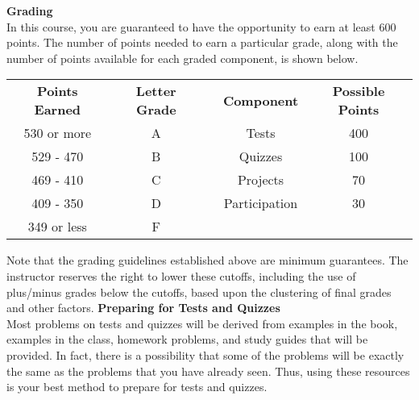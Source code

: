 \documentclass[addpoints,12pt]{exam}
\begin{document}
\wl
\noindent \textbf{Grading} \\
In this course, you are guaranteed to have the opportunity to earn at least 600 points. The number of points needed to earn a particular grade, along with the number of points available for each graded component, is shown below.

\begin{table}[h] \sffamily \centering
\begin{tabular}{|c|c|lcc}
\cline{1-2} \cline{4-5} 
\textbf{Points Earned} & \textbf{Letter Grade} &             \multicolumn{1}{l|}{}            & \multicolumn{1}{c|}{\textbf{Component}}                    &    \multicolumn{1}{c|}{\textbf{Possible Points}}                                           \\ \cline{1-2} \cline{4-5} 
530 or more          & A                     & \multicolumn{1}{l|}{} & \multicolumn{1}{c|}{Tests} & \multicolumn{1}{c|}{400} \\ \cline{1-2} \cline{4-5} 
529 - 470              & B                     & \multicolumn{1}{l|}{} & \multicolumn{1}{c|}{Quizzes}              & \multicolumn{1}{c|}{100}                      \\ \cline{1-2} \cline{4-5} 
469 - 410                & C                     & \multicolumn{1}{l|}{} & \multicolumn{1}{c|}{Projects}            & \multicolumn{1}{c|}{70}                      \\ \cline{1-2} \cline{4-5} 
409 - 350                & D                     & \multicolumn{1}{l|}{} & \multicolumn{1}{c|}{Participation}            & \multicolumn{1}{c|}{30}                      \\ \cline{1-2} \cline{4-5}
349 or less          & F                     &         \hspace{1.5cm}                & \multicolumn{1}{l}{}                    &                                               \\ \cline{1-2}
\end{tabular}
\end{table}
\noindent Note that the grading guidelines established above are minimum guarantees. The instructor reserves the right to lower these cutoffs, including the use of plus/minus grades below the cutoffs, based upon the clustering of final grades and other factors.
\newpage
\noindent \textbf{Preparing for Tests and Quizzes} \\
Most problems on tests and quizzes will be derived from examples in the book, examples in the class, homework problems, and study guides that will be provided. In fact, there is a possibility that some of the problems will be exactly the same as the problems that you have already seen. Thus, using these resources is your best method to prepare for tests and quizzes.
\end{document}
